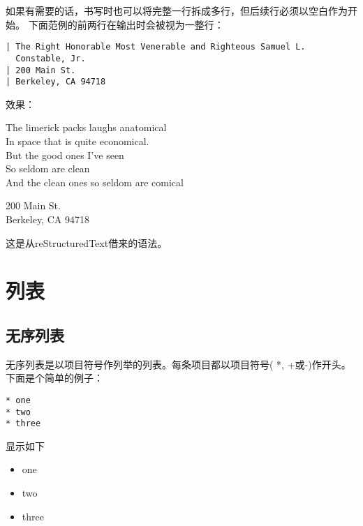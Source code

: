 \documentclass[fancyhdr,bookmark]{ctexbook}
\providecommand{\tightlist}{%
  \setlength{\itemsep}{0pt}\setlength{\parskip}{0pt}}
\begin{document}
如果有需要的话，书写时也可以将完整一行拆成多行，但后续行必须以空白作为开始。
下面范例的前两行在输出时会被视为一整行：

\begin{lstlisting}
| The Right Honorable Most Venerable and Righteous Samuel L.
  Constable, Jr.
| 200 Main St.
| Berkeley, CA 94718
\end{lstlisting}

效果：

The limerick packs laughs anatomical\\
In space that is quite economical.\\
\hspace*{0.333em}\hspace*{0.333em}\hspace*{0.333em}But the good ones
I've seen\\
\hspace*{0.333em}\hspace*{0.333em}\hspace*{0.333em}So seldom are clean\\
And the clean ones so seldom are comical

200 Main St.\\
Berkeley, CA 94718

这是从reStructuredText借来的语法。

\hypertarget{ux5217ux8868}{%
\section{列表}\label{ux5217ux8868}}

\hypertarget{ux65e0ux5e8fux5217ux8868}{%
\subsection{无序列表}\label{ux65e0ux5e8fux5217ux8868}}

无序列表是以项目符号作列举的列表。每条项目都以项目符号( *, +或-)作开头。
下面是个简单的例子：

\begin{lstlisting}
* one
* two
* three
\end{lstlisting}

显示如下

\begin{itemize}
\tightlist
\item
  one
\item
  two
\item
  three
\end{itemize}
\end{document}
